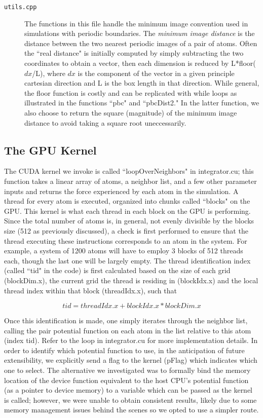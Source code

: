 \documentclass[12pt]{article}
\begin{document}
\begin{description}
\item[\texttt{utils.cpp}]
The functions in this file handle the minimum image convention used in simulations with periodic boundaries.  The {\em minimum image distance} is the distance between the two nearest periodic images of a pair of atoms.  Often the ``real distance" is initially computed by simply subtracting the two coordinates to obtain a vector, then each dimension is reduced by L*floor($dx$/L), where $dx$ is the component of the vector in a given principle cartesian direction and L is the box length in that direction.  While general, the floor function is costly and can be replicated with while loops as illustrated in the functions ``pbc" and ``pbcDist2."  In the latter function, we also choose to return the square (magnitude) of the minimum image distance to avoid taking a square root uneccessarily.

\end{description}

\subsection{The GPU Kernel}
\label{sec:gpukernel}
The CUDA kernel we invoke is called ``loopOverNeighbors" in integrator.cu; this function takes a linear array of atoms, a neighbor list, and
a few other parameter inputs and returns the force experienced by each atom in the simulation.  A thread for every atom is executed, organized into chunks called ``blocks" on the GPU.   This kernel is what each thread in each block  on the GPU is performing.   Since the total number of atoms is, in general, not evenly divisible by the blocks size (512 as previously discussed), a check is first performed to ensure that the thread executing these instructions corresponds to an atom in the system.  For example, a system of 1200 atoms will have to employ 3 blocks of 512 threads each, though the last one will be largely empty.  The thread identification index (called ``tid" in the code) is first calculated based on the size of each grid (blockDim.x), the current grid the thread is residing in (blockIdx.x) and the local thread index within that block (threadIdx.x), such that

\begin{equation}
	tid = threadIdx.x + blockIdx.x*blockDim.x
\end{equation}

Once this identification is made, one simply iterates through the neighbor list, calling the pair potential function on each atom in the list relative to this atom (index tid).  Refer to the loop in integrator.cu for more implementation details.  In order to identify which potential function to use, in the anticipation of future extensibility, we explicitly send a flag to the kernel (pFlag) which indicates which one to select.  The alternative we investigated was to formally bind the memory location of the device function equivalent to the host CPU's potential function (as a pointer to device memory) to a variable which can be passed as the kernel is called; however, we were unable to obtain consistent results, likely due to some memory management issues behind the scenes so we opted to use a simpler route.
\end{document}
